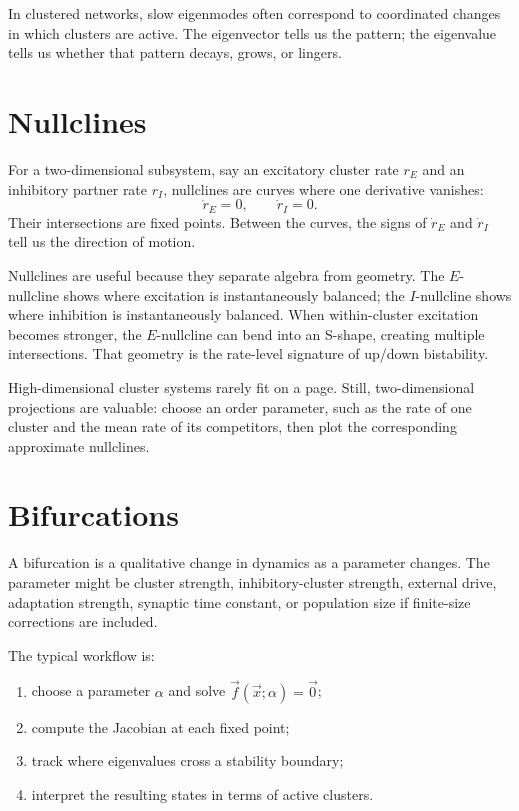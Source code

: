 In clustered networks, slow eigenmodes often correspond to coordinated changes in which clusters are active. The eigenvector tells us the pattern; the eigenvalue tells us whether that pattern decays, grows, or lingers.

\section{Nullclines}
\label{sec:nullclines-clustered}

For a two-dimensional subsystem, say an excitatory cluster rate $r_E$ and an inhibitory partner rate $r_I$, nullclines are curves where one derivative vanishes:
%
\begin{equation}
  \dot r_E=0,
  \qquad
  \dot r_I=0.
  \label{eq:nullcline-definition}
\end{equation}
%
Their intersections are fixed points. Between the curves, the signs of $\dot r_E$ and $\dot r_I$ tell us the direction of motion.

Nullclines are useful because they separate algebra from geometry. The $E$-nullcline shows where excitation is instantaneously balanced; the $I$-nullcline shows where inhibition is instantaneously balanced. When within-cluster excitation becomes stronger, the $E$-nullcline can bend into an S-shape, creating multiple intersections. That geometry is the rate-level signature of up/down bistability.

High-dimensional cluster systems rarely fit on a page. Still, two-dimensional projections are valuable: choose an order parameter, such as the rate of one cluster and the mean rate of its competitors, then plot the corresponding approximate nullclines.

\section{Bifurcations}
\label{sec:bifurcations-clustered}

A bifurcation is a qualitative change in dynamics as a parameter changes. The parameter might be cluster strength, inhibitory-cluster strength, external drive, adaptation strength, synaptic time constant, or population size if finite-size corrections are included.

The typical workflow is:
\begin{enumerate}[leftmargin=*]
  \item choose a parameter $\alpha$ and solve $\vec{f}(\vec{x};\alpha)=\vec{0}$;
  \item compute the Jacobian at each fixed point;
  \item track where eigenvalues cross a stability boundary;
  \item interpret the resulting states in terms of active clusters.
\end{enumerate}

